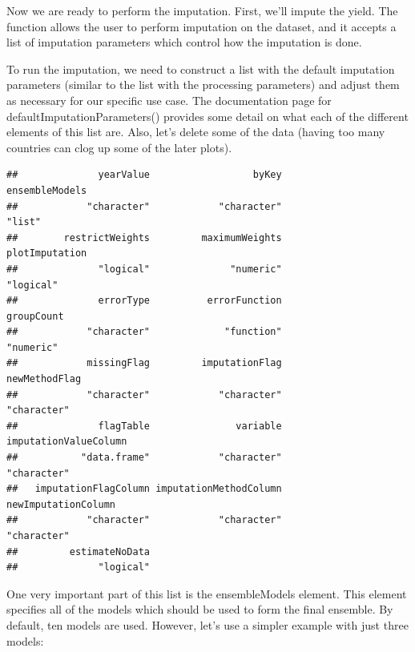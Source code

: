 \documentclass[nojss]{jss}
\begin{document}
Now we are ready to perform the imputation.  First, we'll impute the yield.
The function 
allows the user to perform imputation on the dataset, and it accepts
a list of imputation parameters which control how the imputation is done.

To run the imputation, we need to construct a list with the default imputation
parameters (similar to the list with the processing parameters) and adjust
them as necessary for our specific use case.  The
documentation page for defaultImputationParameters() provides some detail on
what each of the different elements of this list are.  Also, let's delete some
of the data (having too many countries can clog up some of the later plots).

\begin{knitrout}
\color{fgcolor}\begin{kframe}
\begin{alltt}
 \hlkwb{=} \hlstd{okraProcessed[geographicAreaM49} \hlopt{<=} \hlstd{, ]}
 \hlkwb{=} \hlstd{(} \hlstd{=} \hlstd{)}
\end{alltt}
\begin{verbatim}
##              yearValue                  byKey         ensembleModels 
##            "character"            "character"                 "list" 
##        restrictWeights         maximumWeights         plotImputation 
##              "logical"              "numeric"              "logical" 
##              errorType          errorFunction             groupCount 
##            "character"             "function"              "numeric" 
##            missingFlag         imputationFlag          newMethodFlag 
##            "character"            "character"            "character" 
##              flagTable               variable  imputationValueColumn 
##           "data.frame"            "character"            "character" 
##   imputationFlagColumn imputationMethodColumn    newImputationColumn 
##            "character"            "character"            "character" 
##         estimateNoData 
##              "logical"
\end{verbatim}
\end{kframe}
\end{knitrout}

One very important part of this list is the ensembleModels element.  This
element specifies all of the models which should be used to form the final
ensemble.  By default, ten models are used.  However, let's use a simpler
example with just three models:
\end{document}
